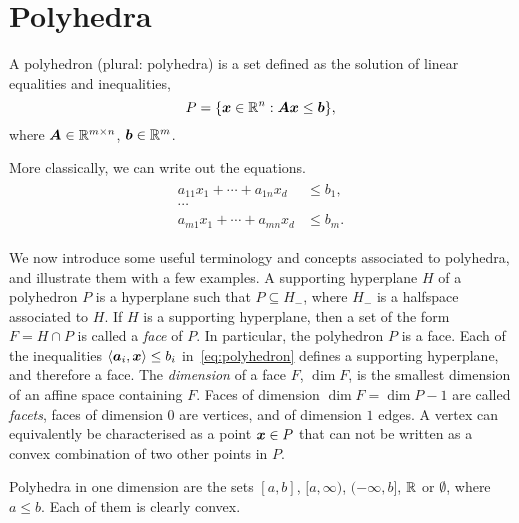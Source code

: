\section{Polyhedra}

\begin{definition}
 A polyhedron (plural: polyhedra) is a set defined as the solution of linear equalities and inequalities,
 \begin{equation}\label{eq:polyhedron}
  P = \{\bm{x}\in \mathbb{R}^n \mathrel{\mathop{:}} \bm{A}\bm{x}\leq \bm{b}\},
 \end{equation}
where $\bm{A}\in \mathbb{R}^{m\times n}$, $\bm{b}\in \mathbb{R}^m$. 
\end{definition}

More classically, we can write out the equations.
\begin{align}\label{eq:eq}
\begin{split}
 a_{11}x_1+\cdots +a_{1n}x_d &\leq b_1,\\
 \cdots& \\
 a_{m1}x_1+\cdots +a_{mn}x_d & \leq b_m.
 \end{split}
\end{align}

We now introduce some useful terminology and concepts associated to polyhedra, and illustrate them with a few examples.
A supporting hyperplane $H$ of a polyhedron $P$ is a hyperplane such that $P\subseteq H_-$, where $H_-$ is a halfspace associated to $H$. If $H$ is a supporting hyperplane, then a set of the form $F=H\cap P$ is called a {\em face} of $P$. In particular, the polyhedron $P$ is a face.
Each of the inequalities $\langle {\bm{a}_i}, {\bm{x}} \rangle\leq b_i$ in~\eqref{eq:polyhedron} defines a supporting hyperplane, and therefore a face. The {\em dimension} of a face $F$,
$\dim F$, is the smallest dimension of an affine space containing $F$. Faces of dimension $\dim F=\dim P-1$ are called {\em facets}, faces of dimension $0$ are vertices, and of dimension $1$ edges. A vertex can equivalently be characterised as a point $\bm{x}\in P$ that can not be written as a convex combination of two other points in $P$.

\begin{example}
 Polyhedra in one dimension are the sets $[a,b]$, $[a,\infty)$, $(-\infty,b]$, $\mathbb{R}$ or $\emptyset$, where $a\leq b$. Each of them is clearly convex.
\end{example}

